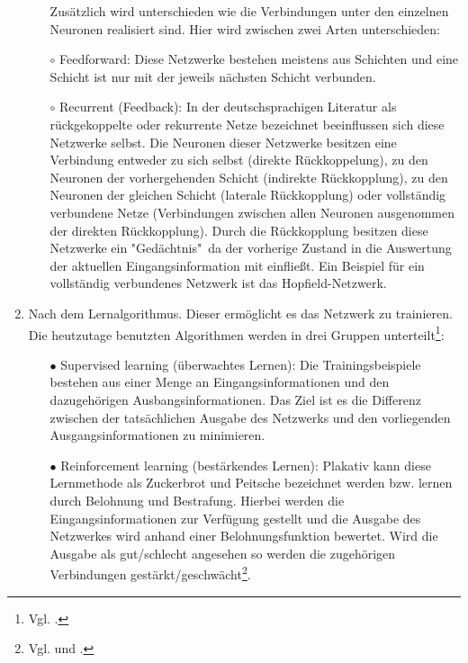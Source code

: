 \begin{enumerate}
\begin{itemize}
Zusätzlich wird unterschieden wie die Verbindungen unter den einzelnen Neuronen realisiert sind. Hier wird zwischen zwei Arten unterschieden:

\item[$\circ$]%
Feedforward: Diese Netzwerke bestehen meistens aus Schichten und eine Schicht ist nur mit der jeweils nächsten Schicht verbunden.

\item[$\circ$]%
Recurrent (Feedback): In der deutschsprachigen Literatur als rückgekoppelte oder rekurrente Netze bezeichnet beeinflussen sich diese Netzwerke selbst. Die Neuronen dieser Netzwerke besitzen eine Verbindung entweder zu sich selbst (direkte Rückkoppelung), zu den Neuronen der vorhergehenden Schicht (indirekte Rückkopplung), zu den Neuronen der gleichen Schicht (laterale Rückkopplung) oder vollständig verbundene Netze (Verbindungen zwischen allen Neuronen ausgenommen der direkten Rückkopplung). Durch die Rückkopplung besitzen diese Netzwerke ein "Gedächtnis"~da der vorherige Zustand in die Auswertung der aktuellen Eingangsinformation mit einfließt. Ein Beispiel für ein vollständig verbundenes Netzwerk ist das Hopfield-Netzwerk.

\end{itemize}

\item%
Nach dem Lernalgorithmus. Dieser ermöglicht es das Netzwerk zu trainieren. Die heutzutage benutzten Algorithmen werden in drei Gruppen unterteilt\footnote{Vgl. \citet[55]{dkriesel07}.\label{kriesel55}}:

\begin{itemize}
\item[\textbf{$\bullet$}]%
Supervised learning (überwachtes Lernen): Die Trainingsbeispiele bestehen aus einer Menge an Eingangsinformationen und den dazugehörigen Ausbangsinformationen. Das Ziel ist es die Differenz zwischen der tatsächlichen Ausgabe des Netzwerks und den vorliegenden Ausgangsinformationen zu minimieren.

\item[\textbf{$\bullet$}]%
Reinforcement learning (bestärkendes Lernen): Plakativ kann diese Lernmethode als Zuckerbrot und Peitsche bezeichnet werden bzw. lernen durch Belohnung und Bestrafung. Hierbei werden die Eingangsinformationen zur Verfügung gestellt und die Ausgabe des Netzwerkes wird anhand einer Belohnungsfunktion bewertet. Wird die Ausgabe als gut/schlecht angesehen so werden die zugehörigen Verbindungen gestärkt/geschwächt\footnote{Vgl. \citet[201]{dkriesel07} und \citet[A2.3:5]{Fiesler96}.}. 


\end{itemize}
\end{enumerate}

